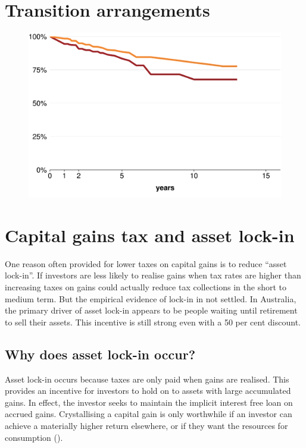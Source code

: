 \documentclass{grattan}\usepackage[]{graphicx}\usepackage[]{color}
\begin{document}
\chapter{Transition arrangements}





\begin{figure}

\includegraphics[width=\columnwidth]{CGT-NG-atlas//NG-survival-curve-1}

\end{figure}
\printbibliography[title=References]


\appendix
\chapter{Capital gains tax and asset lock-in}
One reason often provided for lower taxes on capital gains is to reduce ``asset lock-in''. If investors are less likely to realise gains when tax rates are higher than increasing taxes on gains could actually reduce tax collections in the short to medium term. But the empirical evidence of lock-in in not settled. In Australia, the primary driver of asset lock-in appears to be people waiting until retirement to sell their assets. This incentive is still strong even with a 50 per cent discount. 

\section{Why does asset lock-in occur?}
Asset lock-in occurs because taxes are only paid when gains are realised. This provides an incentive for investors to hold on to assets with large accumulated gains.  In effect, the investor seeks to maintain the implicit interest free loan on accrued gains. Crystallising a capital gain is only worthwhile if an investor can achieve a materially higher return elsewhere, or if they want the resources for consumption ().   
\end{document}

